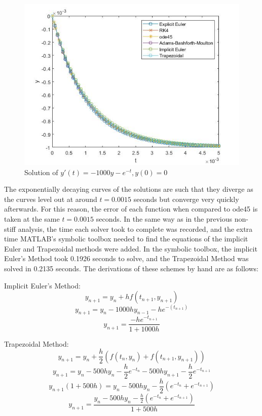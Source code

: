 \documentclass[11pt]{article}
\begin{document}
\begin{figure} [h]
\centering
        \includegraphics[totalheight=10cm]{figure4.jpg}
    \caption{Solution of $y'(t)=-1000y-e^{-t}, y(0)=0$}
    \label{figure7}
\end{figure}

The exponentially decaying curves of the solutions are such that they diverge
as the curves level out at around $t=0.0015$ seconds but converge very quickly afterwards.
For this reason, the error of each function when compared to ode45 is taken at the same
$t=0.0015$ seconds. In the same way as in the previous non-stiff analysis, the time each
solver took to complete was recorded, and the extra time MATLAB's symbolic
toolbox needed to find the equations of the implicit Euler and Trapezoidal methods
were added. In the symbolic toolbox, the implicit Euler's Method took 0.1926 seconds to solve,
and the Trapezoidal Method was solved in 0.2135 seconds. The derivations of these 
schemes by hand are as follows:
 
Implicit Euler's Method:
$$y_{n+1}=y_{n}+hf(t_{n+1}, y_{n+1})$$
$$y_{n+1}=y_{n}-1000hy_{n-1}-he^{-(t_{n+1})}$$
$$y_{n+1}=\frac{-he^{-t_{n+1}}}{1+1000h}$$

Trapezoidal Method:
$$y_{n+1}=y_{n}+\frac{h}{2}(f(t_{n},y_{n})+f(t_{n+1},y_{n+1}))$$
$$y_{n+1}=y_{n}-500hy_{n}-\frac{h}{2}e^{-t_{n}}-500hy_{n+1}-\frac{h}{2}e^{-t_{n+1}}$$
$$y_{n+1}(1+500h)=y_{n}-500hy_{n}-\frac{h}{2}(e^{-t_{n}}+e^{-t_{n+1}})$$
$$y_{n+1}=\frac{y_{n}-500hy_{n}-\frac{h}{2}(e^{-t_{n}}+e^{-t_{n+1}})}{1+500h}$$
\end{document}
